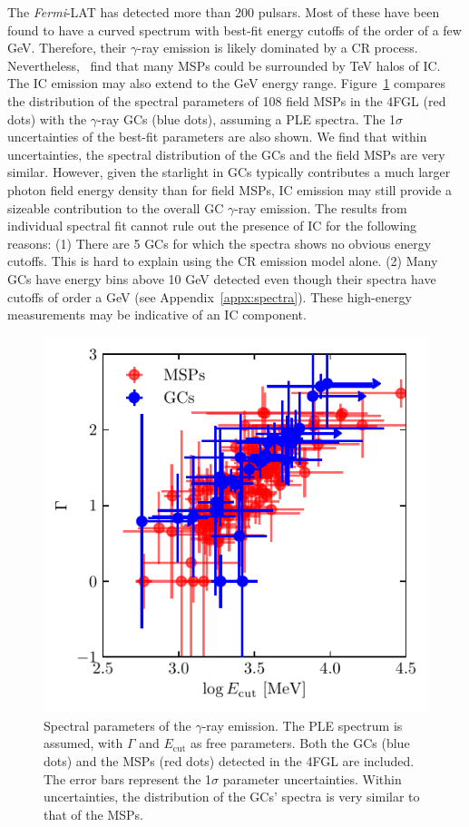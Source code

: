 \documentclass[doublespace,draft,nopageskip]{VTthesis} %
\begin{document}
The \textit{Fermi}-LAT has detected more than 200 pulsars. Most of these have been found to have a curved spectrum with best-fit energy cutoffs of the order of a few GeV. Therefore, their $\gamma$-ray emission is likely dominated by a CR process. {Nevertheless,~\citet{2018PhRvD..98d3005H,2021arXiv210400014H} find} that many MSPs could be surrounded by TeV halos of IC. The IC emission may also extend to the GeV energy range. Figure~\ref{fig:msps} compares the distribution of the spectral parameters of 108 field MSPs in the 4FGL (red dots) with the $\gamma$-ray GCs (blue dots), assuming a PLE spectra. The 1$\sigma$ uncertainties of the best-fit parameters are also shown. We find that within uncertainties, the spectral distribution of the GCs and the field MSPs are very similar. However, given the starlight in GCs typically contributes a much larger photon field energy density than for field MSPs, IC emission may still provide a sizeable contribution to the overall GC $\gamma$-ray emission. The results from individual spectral fit cannot rule out the presence of IC for the following reasons: (1) There are 5 GCs for which the spectra shows no obvious energy cutoffs. This is hard to explain using the CR emission model alone. (2) Many GCs have energy bins above 10 GeV detected even though their spectra have cutoffs of order a GeV (see Appendix~\ref{appx:spectra}). These high-energy measurements may be indicative of an IC component.

\begin{figure}
    \centering
    \includegraphics[width=\columnwidth]{Figures/Globular/msp_vs_gc.pdf}
    \caption{Spectral parameters of the $\gamma$-ray emission. The PLE spectrum is assumed, with $\Gamma$ and $E_\mathrm{cut}$ as free parameters. Both the GCs (blue dots) and the MSPs (red dots) detected in the 4FGL are included. The error bars represent the 1$\sigma$ parameter uncertainties. Within uncertainties, the distribution of the GCs' spectra is very similar to that of the MSPs.}
    \label{fig:msps}
\end{figure}
\end{document}
